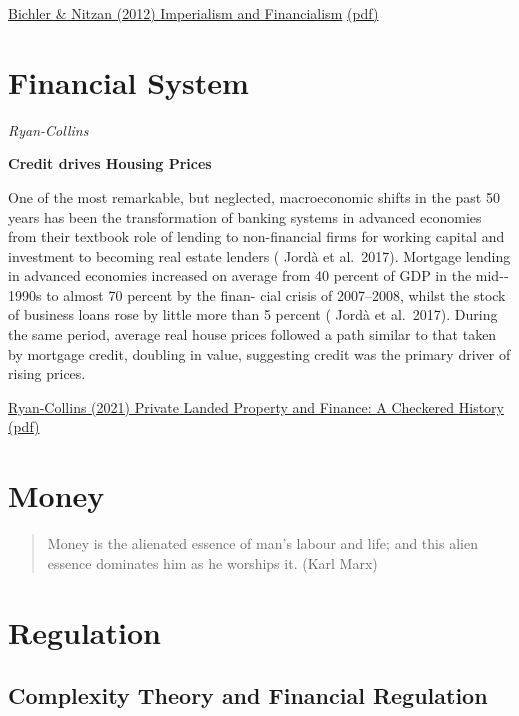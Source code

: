 \documentclass[
]{book}
\begin{document}
\href{http://bnarchives.yorku.ca/329/}{Bichler \& Nitzan (2012) Imperialism and Financialism}
\href{pdf/Bichler_Nitzan_2012_Imperialism_and_Financialism.pdf}{(pdf)}

\hypertarget{financial-system}{%
\chapter{Financial System}\label{financial-system}}

\emph{Ryan-Collins}

\textbf{Credit drives Housing Prices}

One of the most remarkable, but
neglected, macroeconomic shifts in the past 50 years has been the
transformation of banking systems in advanced economies from their
textbook role of lending to non-­financial firms for working capital
and investment to becoming real estate lenders ( Jordà et al.~2017).
Mortgage lending in advanced economies increased on average from
40 percent of GDP in the mid-­1990s to almost 70 percent by the finan-
cial crisis of 2007--­2008, whilst the stock of business loans rose by
little more than 5 percent ( Jordà et al.~2017). During the same period,
average real house prices followed a path similar to that taken by
mortgage credit, doubling in value, suggesting credit was the primary
driver of rising prices.

\href{https://onlinelibrary.wi\%20ley.com/doi/10.1111/ajes.12387}{Ryan-Collins (2021) Private Landed Property and Finance: A Checkered History}
\href{pdf/Ryan-Collins_2021_Private_Landed_Property_and_Finance.pdf}{(pdf)}

\hypertarget{money-1}{%
\chapter{Money}\label{money-1}}

\begin{quote}
Money is the alienated essence of man's labour and life; and this alien essence dominates him as he worships it. (Karl Marx)
\end{quote}

\hypertarget{regulation}{%
\chapter{Regulation}\label{regulation}}

\hypertarget{complexity-theory-and-financial-regulation}{%
\section{Complexity Theory and Financial Regulation}\label{complexity-theory-and-financial-regulation}}
\end{document}
